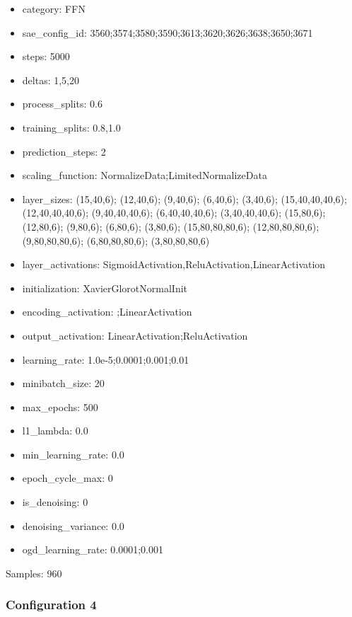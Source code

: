 \documentclass[a4paper,11pt,oneside]{article}
\theoremstyle{plain}
\theoremstyle{definition}
\begin{document}
\begin{itemize}
	\item category: FFN
	\item sae\_config\_id: 3560;3574;3580;3590;3613;3620;3626;3638;3650;3671
	\item steps: 5000
	\item deltas: 1,5,20
	\item process\_splits: 0.6
	\item training\_splits: 0.8,1.0
	\item prediction\_steps: 2
	\item scaling\_function: NormalizeData;LimitedNormalizeData
	\item layer\_sizes: (15,40,6); (12,40,6); (9,40,6); (6,40,6); (3,40,6); (15,40,40,40,6); (12,40,40,40,6); (9,40,40,40,6); (6,40,40,40,6); (3,40,40,40,6); (15,80,6);(12,80,6); (9,80,6); (6,80,6); (3,80,6); (15,80,80,80,6); (12,80,80,80,6); (9,80,80,80,6); (6,80,80,80,6); (3,80,80,80,6)
	\item layer\_activations: SigmoidActivation,ReluActivation,LinearActivation
	\item initialization: XavierGlorotNormalInit
	\item encoding\_activation: ;LinearActivation
	\item output\_activation: LinearActivation;ReluActivation
	\item learning\_rate: 1.0e-5;0.0001;0.001;0.01
	\item minibatch\_size: 20
	\item max\_epochs: 500
	\item l1\_lambda: 0.0
	\item min\_learning\_rate: 0.0
	\item epoch\_cycle\_max: 0
	\item is\_denoising: 0
	\item denoising\_variance: 0.0
	\item ogd\_learning\_rate: 0.0001;0.001
\end{itemize}

Samples: 960


\subsubsection{Configuration 4}\label{config4}
\end{document}
